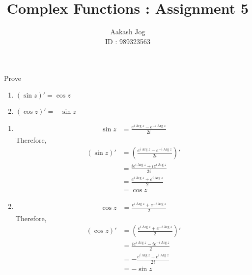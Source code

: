 \documentclass[fleqn, a4paper, 11pt, oneside]{amsart}
\title{Complex Functions : Assignment 5}
\author
{
	Aakash Jog\\
	ID : 989323563
}
\date{\formatdate{25}{11}{2015}}
\theoremstyle{definition}
\theoremstyle{theorem}
\DeclareMathOperator{\Arg}{Arg}
\begin{document}

\maketitle

\setcounter{question}{0}
\begin{question}
	Prove
	\begin{enumerate}
		\item $(\sin z)' = \cos z$
		\item $(\cos z)' = -\sin z$
	\end{enumerate}
\end{question}

\begin{solution}
	\begin{enumerate}[leftmargin=*]
		\item
			\begin{align*}
				\sin z & = \frac{e^{i \Arg z} - e^{-i \Arg z}}{2 i}
			\end{align*}
			Therefore,
			\begin{align*}
				(\sin z)' & = \left( \frac{e^{i \Arg z} - e^{-i \Arg z}}{2 i} \right)' \\
                                          & = \frac{i e^{i \Arg z} + i e^{i \Arg z}}{2 i}              \\
                                          & = \frac{e^{i \Arg z} + e^{i \Arg z}}{2}                    \\
                                          & = \cos z
			\end{align*}
		\item
			\begin{align*}
				\cos z & = \frac{e^{i \Arg z} + e^{-i \Arg z}}{2}
			\end{align*}
			Therefore,
			\begin{align*}
				(\cos z)' & = \left( \frac{e^{i \Arg z} + e^{-i \Arg z}}{2} \right)' \\
                                          & = \frac{i e^{i \Arg z} - i e^{-i \Arg z}}{2}             \\
                                          & = -\frac{e^{i \Arg z} + e^{i \Arg z}}{2 i}               \\
                                          & = -\sin z
			\end{align*}
	\end{enumerate}
\end{solution}
\end{document}
